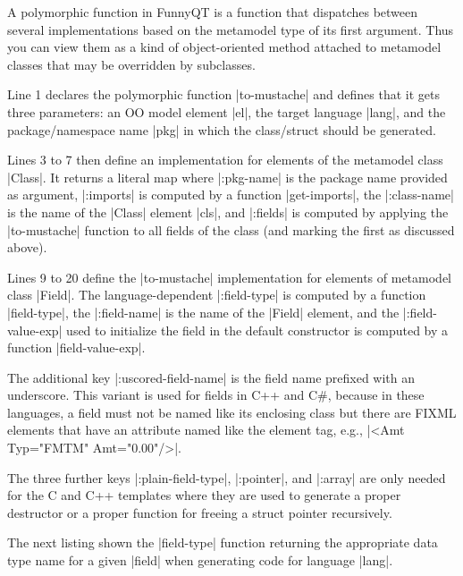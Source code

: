 \documentclass[submission]{eptcs}
\newcommand{\code}{\clojureinline}
\begin{document}
A polymorphic function in FunnyQT is a function that dispatches between several
implementations based on the metamodel type of its first argument.  Thus you
can view them as a kind of object-oriented method attached to metamodel classes
that may be overridden by subclasses.

Line 1 declares the polymorphic function \code|to-mustache| and defines that it
gets three parameters: an OO model element \code|el|, the target language
\code|lang|, and the package/namespace name \code|pkg| in which the
class/struct should be generated.

Lines 3 to 7 then define an implementation for elements of the metamodel class
\code|Class|.  It returns a literal map where \code|:pkg-name| is the package
name provided as argument, \code|:imports| is computed by a function
\code|get-imports|, the \code|:class-name| is the name of the \code|Class|
element \code|cls|, and \code|:fields| is computed by applying the
\code|to-mustache| function to all fields of the class (and marking the first
as discussed above).

Lines 9 to 20 define the \code|to-mustache| implementation for elements of
metamodel class \code|Field|.  The language-dependent \code|:field-type| is
computed by a function \code|field-type|, the \code|:field-name| is the name of
the \code|Field| element, and the \code|:field-value-exp| used to initialize
the field in the default constructor is computed by a function
\code|field-value-exp|.

The additional key \code|:uscored-field-name| is the field name prefixed with
an underscore.  This variant is used for fields in C++ and C\#, because in
these languages, a field must not be named like its enclosing class but there
are FIXML elements that have an attribute named like the element tag, e.g.,
\xmlinline|<Amt Typ="FMTM" Amt="0.00"/>|.

The three further keys \code|:plain-field-type|, \code|:pointer|, and
\code|:array| are only needed for the C and C++ templates where they are used
to generate a proper destructor or a proper function for freeing a struct
pointer recursively.

The next listing shown the \code|field-type| function returning the appropriate
data type name for a given \code|field| when generating code for language
\code|lang|.
\end{document}
